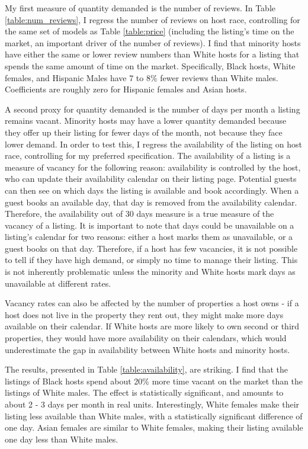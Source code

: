 My first measure of quantity demanded is the number of reviews. In Table \ref{table:num_reviews}, I regress the number of reviews on host race, controlling for the same set of models as Table \ref{table:price} (including the listing's time on the market, an important driver of the number of reviews). I find that minority hosts have either the same or lower review numbers than White hosts for a listing that spends the same amount of time on the market. Specifically, Black hosts, White females, and Hispanic Males have 7 to 8\% fewer reviews than White males. Coefficients are roughly zero for Hispanic females and Asian hosts. 

A second proxy for quantity demanded is the number of days per month a listing remains vacant. Minority hosts may have a lower quantity demanded because they offer up their listing for fewer days of the month, not because they face lower demand. In order to test this, I regress the availability of the listing on host race, controlling for my preferred specification. The availability of a listing is a measure of vacancy for the following reason: availability is controlled by the host, who can update their availability calendar on their listing page. Potential guests can then see on which days the listing is available and book accordingly. When a guest books an available day, that day is removed from the availability calendar. Therefore, the availability out of 30 days measure is a true measure of the vacancy of a listing. It is  important to note that days could be unavailable on a listing's calendar for two reasons: either a host marks them as unavailable, or a guest books on that day. Therefore, if a host has few vacancies, it is not possible to tell if they have high demand, or simply no time to manage their listing. This is not inherently problematic unless the minority and White hosts mark days as unavailable at different rates. 

Vacancy rates can also be affected by the number of properties a host owns - if a host does not live in the property they rent out, they might make more days available on their calendar. If White hosts are more likely to own second or third properties, they would have more availability on their calendars, which would underestimate the gap in availability between White hosts and minority hosts.  

The results, presented in Table \ref{table:availability}, are striking. I find that the listings of Black hosts spend about 20\% more time vacant on the market than the listings of White males. The effect is statistically significant, and amounts to about 2 - 3 days per month in real units. Interestingly, White females make their listing less available than White males, with a statistically significant difference of one day. Asian females are similar to White females, making their listing available one day less than White males. 

